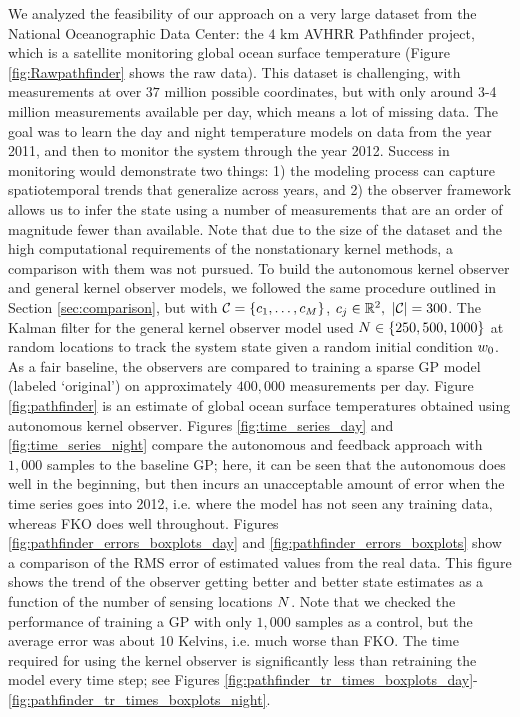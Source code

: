 We analyzed the feasibility of our approach on a very large dataset from the National Oceanographic Data Center: the $4$ km AVHRR Pathfinder project, which is a satellite monitoring global ocean surface temperature (Figure \ref{fig:Rawpathfinder} shows the raw data). This dataset is challenging, with measurements at over $37$ million possible coordinates, but with only around 3-4 million measurements available per day, which means a lot of missing data. The goal was to learn the day and night temperature models on data from the year 2011, and then to monitor the system through the year 2012. Success in monitoring would demonstrate two things: 1) the modeling process can capture spatiotemporal trends that generalize across years, and 2) the observer framework allows us to infer the state using a number of measurements that are an order of magnitude fewer than available. Note that due to the size of the dataset and the high computational requirements of the nonstationary kernel methods, a comparison with them was not pursued. To build the autonomous kernel observer and general kernel observer models, we followed the same procedure outlined in Section \ref{sec:comparison}, but with $\mathcal{C}=\{c_1,\dots,c_{M}\}$, $c_{j}\in\mathbb{R}^{2}, \ |\mathcal{C}| = 300$. The Kalman filter for the general kernel observer model  used $N \in \{250,500,1000\}$ at random locations to track the system state given a random initial condition $w_0$. As a fair baseline, the observers are compared to training a sparse GP model (labeled `original')  on approximately $400,000$ measurements per day. %
Figure \ref{fig:pathfinder} is an estimate of global ocean surface temperatures obtained using autonomous kernel observer.
Figures \ref{fig:time_series_day} and \ref{fig:time_series_night} compare the autonomous and feedback approach with $1,000$ samples to the baseline GP; here, it can be seen that the autonomous does well in the beginning, but then incurs an unacceptable amount of error when the time series goes into 2012, i.e. where the model has not seen any training data, whereas FKO does well throughout. 
Figures %
\ref{fig:pathfinder_errors_boxplots_day} 
and %
\ref{fig:pathfinder_errors_boxplots} 
show a  comparison of the RMS error of estimated values from the real data.
This figure shows the trend of the observer getting better and better state estimates as a function of the number of sensing locations $N$. Note that we checked the performance of training a GP with only $1,000$ samples as a control, but the average error was about 10 Kelvins, i.e. much worse than FKO.
The time required for using the kernel observer is significantly less than retraining the model every time step; see Figures %
 \ref{fig:pathfinder_tr_times_boxplots_day}-\ref{fig:pathfinder_tr_times_boxplots_night}.
 

